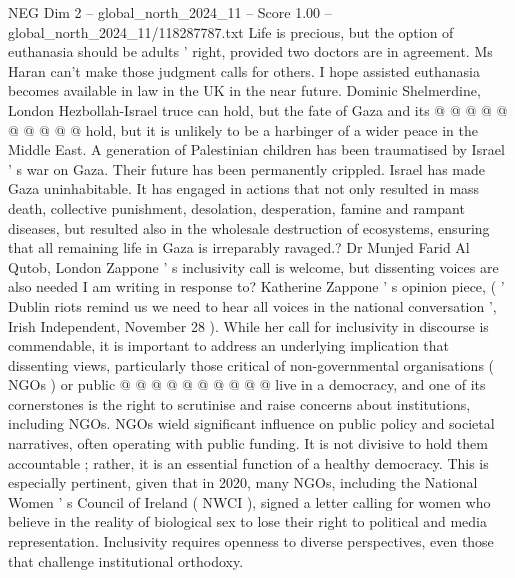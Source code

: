 \begin{textsample}{NEG Dim 2 – global\_north\_2024\_11 – Score 1.00 – global\_north\_2024\_11/118287787.txt}
Life is precious, but the option of euthanasia should be adults ' right, provided two doctors are in agreement.
Ms Haran can't make those judgment calls for others.
I hope assisted euthanasia becomes available in law in the UK in the near future.
Dominic Shelmerdine, London Hezbollah-Israel truce can hold, but the fate of Gaza and its @ @ @ @ @ @ @ @ @ @ hold, but it is unlikely to be a harbinger of a wider peace in the Middle East.
A generation of Palestinian children has been traumatised by Israel ' s war on Gaza.
Their future has been permanently crippled.
Israel has made Gaza uninhabitable.
It has engaged in actions that not only resulted in mass death, collective punishment, desolation, desperation, famine and rampant diseases, but resulted also in the wholesale destruction of ecosystems, ensuring that all remaining life in Gaza is irreparably ravaged.?
Dr Munjed Farid Al Qutob, London Zappone ' s inclusivity call is welcome, but dissenting voices are also needed I am writing in response to?
Katherine Zappone ' s opinion piece, ( ' Dublin riots remind us we need to hear all voices in the national conversation ', Irish Independent, November 28 ).
While her call for inclusivity in discourse is commendable, it is important to address an underlying implication that dissenting views, particularly those critical of non-governmental organisations ( NGOs ) or public @ @ @ @ @ @ @ @ @ @ live in a democracy, and one of its cornerstones is the right to scrutinise and raise concerns about institutions, including NGOs.
NGOs wield significant influence on public policy and societal narratives, often operating with public funding.
It is not divisive to hold them accountable ; rather, it is an essential function of a healthy democracy.
This is especially pertinent, given that in 2020, many NGOs, including the National Women ' s Council of Ireland ( NWCI ), signed a letter calling for women who believe in the reality of biological sex to lose their right to political and media representation.
Inclusivity requires openness to diverse perspectives, even those that challenge institutional orthodoxy.

\end{textsample}

